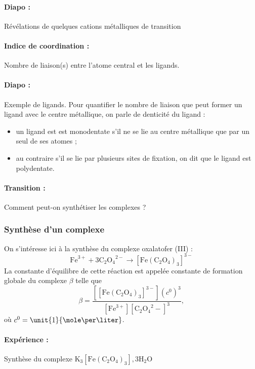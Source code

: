 \paragraph{Diapo :} Révélations de quelques cations métalliques de transition

\paragraph{Indice de coordination : } Nombre de liaison(s) entre l'atome central et les ligands.

\paragraph{Diapo :} Exemple de ligands.
Pour quantifier le nombre de liaison que peut former un ligand avec le centre métallique, on parle de denticité du ligand :
\begin{itemize}
\item un ligand est est monodentate s'il ne se lie au centre métallique que par un seul de ses atomes ;
\item au contraire s'il se lie par plusieurs sites de fixation, on dit que le ligand est polydentate.
\end{itemize}

\paragraph{Transition :} Comment peut-on synthétiser les complexes ?

\subsubsection{Synthèse d'un complexe}

On s'intéresse ici à la synthèse du complexe oxalatofer (III) :
\begin{equation*}
\mathrm{Fe}^{3+} + 3 \mathrm{C_2O_4}^{2-} \rightarrow \mathrm{[Fe(C_2O_4)_3]}^{3-}
\end{equation*}
La constante d'équilibre de cette réaction est appelée constante de formation globale du complexe $\beta$ telle que
\begin{equation*}
\beta = \frac{[\mathrm{[Fe(C_2O_4)_3]}^{3-}](c^0)^3}{[\mathrm{Fe}^{3+}][\mathrm{C_2O_4}^2-]^3},
\end{equation*}
où $c^0 = \unit{1}{\mole\per\liter}$.

\paragraph{Expérience :} Synthèse du complexe $\mathrm{K_3[Fe(C_2O_4)_3],3H_2O}$

